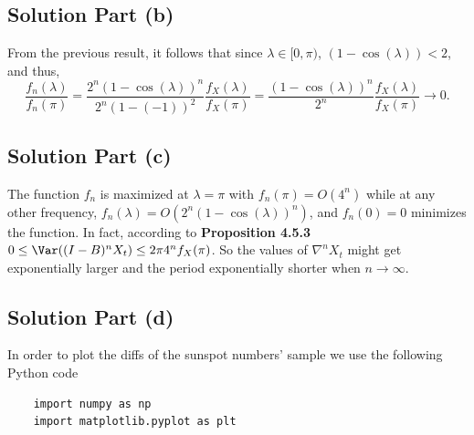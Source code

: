 \subsection*{Solution Part (b)}

From the previous result, it follows that since $\lambda \in [0,\pi)$, $(1-\cos(\lambda)) < 2$, and thus,
\[ \frac{f_n(\lambda)}{f_n(\pi)} = \frac{2^n (1-\cos(\lambda))^n}{2^n (1-(-1))^2} \frac{f_X(\lambda)}{f_X(\pi)} = \frac{(1-\cos(\lambda))^n}{2^n} \frac{f_X(\lambda)}{f_X(\pi)} \to 0.\]

\subsection*{Solution Part (c)}

The function $f_n$ is maximized at $\lambda = \pi$ with $f_n(\pi) = O(4^n)$ while at any other frequency, $f_n(\lambda) = O(2^n (1-\cos(\lambda))^n)$, and $f_n(0) = 0$ minimizes the function. In fact, according to\textbf{ Proposition 4.5.3} $0 \leq \Var((I-B)^n X_t) \leq 2\pi 4^n f_X(\pi)$. So the values of $\nabla^n X_t$ might get exponentially larger and the period exponentially shorter when $n \to \infty$.

\subsection*{Solution Part (d)}

In order to plot the diffs of the sunspot numbers' sample we use the following Python code

\begin{verbatim}
    import numpy as np
    import matplotlib.pyplot as plt
\end{verbatim}


